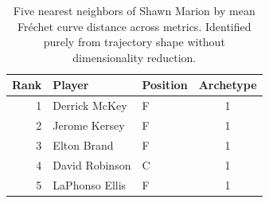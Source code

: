 \begin{table}[htbp]
  \centering\small
  \begin{tabular}{rllc}
    \toprule
    Rank & Player & Position & Archetype \\
    \midrule
    1 & Derrick McKey & F & 1 \\
    2 & Jerome Kersey & F & 1 \\
    3 & Elton Brand & F & 1 \\
    4 & David Robinson & C & 1 \\
    5 & LaPhonso Ellis & F & 1 \\
    \bottomrule
  \end{tabular}
  \caption{Five nearest neighbors of Shawn Marion by mean Fr\'{e}chet curve distance across metrics. Identified purely from trajectory shape without dimensionality reduction.}
  \label{tab:Shawn_Marion_frechet_curve_neighbors}
\end{table}

